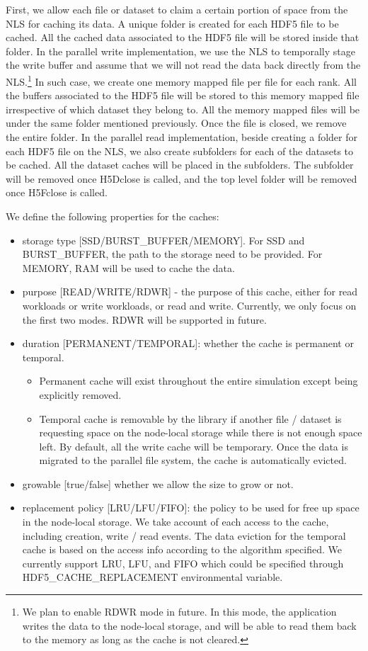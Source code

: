 \documentclass[aps, rmp, 11pt, notitlepage]{revtex4-1}
\begin{document}
First, we allow each file or dataset to claim a certain portion of space from the NLS for caching its data. A unique folder is created for each HDF5 file to be cached. All the cached data associated to the HDF5 file will be stored inside that folder. In the parallel write implementation, we use the NLS to temporally stage the write buffer and assume that we will not read the data back directly from the NLS.\footnote{We plan to enable RDWR mode in future. In this mode, the application writes the data to the node-local storage, and will be able to read them back to the memory as long as the cache is not cleared.} In such case, we create one memory mapped file per file for each rank. All the buffers associated to the HDF5 file will be stored to this memory mapped file irrespective of which dataset they belong to. All the memory mapped files will be under the same folder mentioned previously. Once the file is closed, we remove the entire folder.  In the parallel read implementation, beside creating a folder for each HDF5 file on the NLS, we also create subfolders for each of the datasets to be cached. All the dataset caches will be placed in the subfolders. The subfolder will be removed once H5Dclose is called, and the top level folder will be removed once H5Fclose is called. 

We define the following properties for the caches: 
\begin{itemize}
\item storage type [SSD/BURST\_BUFFER/MEMORY]. For SSD and BURST\_BUFFER, the path to the storage need to be provided. For MEMORY, RAM will be used to cache the data. 
\item purpose [READ/WRITE/RDWR] - the purpose of this cache, either for read workloads or write workloads, or read and write. Currently, we only focus on the first two modes. RDWR will be supported in future. 
\item duration [PERMANENT/TEMPORAL]: whether the cache is permanent or temporal. 
\begin{itemize}
\item Permanent cache will exist throughout the entire simulation except being explicitly removed. 
\item Temporal cache is removable by the library if another file / dataset is requesting space on the node-local storage while there is not enough space left. By default, all the write cache will be temporary. Once the data is migrated to the parallel file system, the cache is automatically evicted.
\end{itemize}
\item growable [true/false] whether we allow the size to grow or not. 
\item replacement policy [LRU/LFU/FIFO]: the policy to be used for free up space in the node-local storage. 
We take account of each access to the cache, including creation, write / read events. The data eviction for the temporal cache is based on the access info according to the algorithm specified. We currently support LRU, LFU, and FIFO which could be specified through HDF5\_CACHE\_REPLACEMENT environmental variable. 
\end{itemize}
\end{document}
